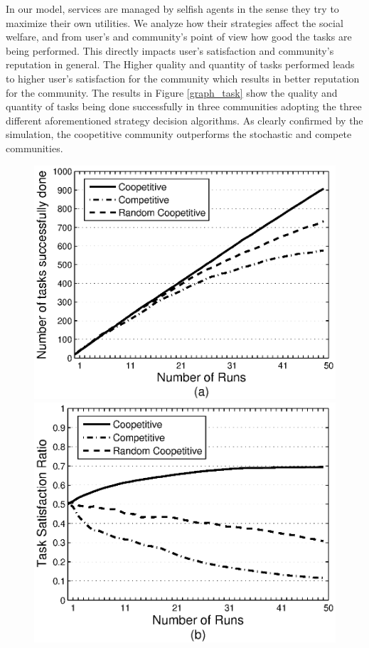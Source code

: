 In our model, services are managed by selfish agents in the sense
they try to maximize their own utilities. We analyze how their
strategies affect the social welfare, and from user's and
community's point of view how good the tasks are being performed.
This directly impacts user's satisfaction and community's
reputation in general. The Higher quality and quantity of tasks
performed leads to higher user's satisfaction for the community
which results in better reputation for the community. The results
in Figure \ref{graph_task} show the quality and quantity of tasks
being done successfully in three communities adopting the three
different aforementioned strategy decision algorithms. As clearly confirmed by the simulation, the coopetitive community
outperforms the stochastic and compete communities.

\begin{figure}[h]
\centering
\includegraphics[scale=0.35]{Figures/graphtaskdone.eps}
\includegraphics[scale=0.35]{Figures/graphtasksatisfaction.eps}

\end{figure}
